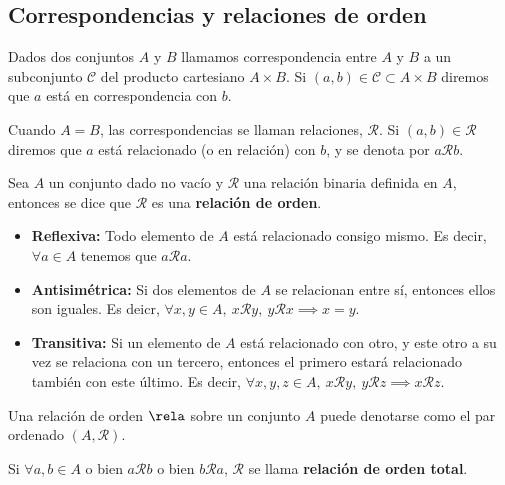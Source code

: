 \subsection{Correspondencias y relaciones de orden}
\begin{definicion}
    Dados dos conjuntos $A$ y $B$ llamamos correspondencia entre $A$ y $B$ a un subconjunto $\mathcal{C}$ del producto cartesiano $A\times B$. Si $\left( a, b \right) \in\mathcal{C}\subset A\times B$ diremos que $a$ está en correspondencia con $b$.
\end{definicion}
\begin{definicion}
    Cuando $A = B$, las correspondencias se llaman relaciones, $\mathcal{R}$. Si $\left( a, b \right)\in\mathcal{R} $ diremos que $a$ está relacionado (o en relación) con $b$, y se denota por $a\mathcal{R}b$.
\end{definicion}
\begin{definition}
    Sea $A$ un conjunto dado no vacío y $\mathcal{R}$ una relación binaria definida en $A$, entonces se dice que $\mathcal{R}$ es una \textbf{relación de orden}.
    \begin{itemize}
        \item\textbf{Reflexiva:} Todo elemento de $A$ está relacionado consigo mismo. Es decir, $\forall a\in A$ tenemos que $a\mathcal{R} a$.
        \item\textbf{Antisimétrica:} Si dos elementos de $A$ se relacionan entre sí, entonces ellos son iguales. Es deicr, $\forall x, y\in A,\ x\mathcal{R} y,\ y\mathcal{R} x \implies x = y$.
        \item\textbf{Transitiva:} Si un elemento de $A$ está relacionado con otro, y este otro a su vez se relaciona con un tercero, entonces el primero estará relacionado también con este último. Es decir, $\forall x, y, z\in A,\ x\mathcal{R} y,\ y\mathcal{R}z\implies x\mathcal{R}z$.
    \end{itemize}
\end{definition}
\begin{notacion}
    Una relación de orden $\rela$ sobre un conjunto $A$ puede denotarse como el par ordenado $\left( A, \mathcal{R} \right) $.
\end{notacion}
\begin{definition}
    Si $\forall a, b\in A$ o bien $a\mathcal{R} b$ o bien $b\mathcal{R} a$, $\mathcal{R}$ se llama \textbf{relación de orden total}.
\end{definition}

